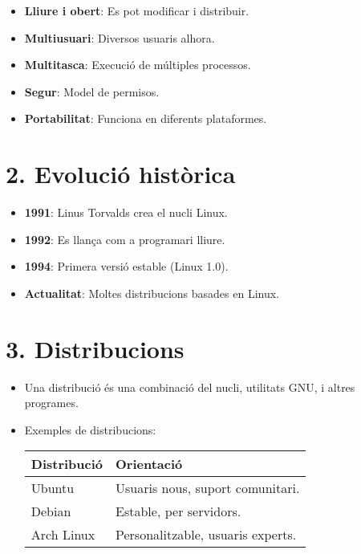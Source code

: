 \documentclass[
  a4paper,
]{article}
\providecommand{\tightlist}{%
  \setlength{\itemsep}{0pt}\setlength{\parskip}{0pt}}
\begin{document}
\begin{itemize}
\tightlist
\item
  \textbf{Lliure i obert}: Es pot modificar i distribuir.
\item
  \textbf{Multiusuari}: Diversos usuaris alhora.
\item
  \textbf{Multitasca}: Execució de múltiples processos.
\item
  \textbf{Segur}: Model de permisos.
\item
  \textbf{Portabilitat}: Funciona en diferents plataformes.
\end{itemize}

\section{2. Evolució històrica}\label{evoluciuxf3-histuxf2rica}

\begin{itemize}
\tightlist
\item
  \textbf{1991}: Linus Torvalds crea el nucli Linux.
\item
  \textbf{1992}: Es llança com a programari lliure.
\item
  \textbf{1994}: Primera versió estable (Linux 1.0).
\item
  \textbf{Actualitat}: Moltes distribucions basades en Linux.
\end{itemize}

\section{3. Distribucions}\label{distribucions}

\begin{itemize}
\item
  Una distribució és una combinació del nucli, utilitats GNU, i altres
  programes.
\item
  Exemples de distribucions:

  \begin{longtable}[]{@{}ll@{}}
  \toprule\noalign{}
  \textbf{Distribució} & \textbf{Orientació} \\
  \midrule\noalign{}
  \endhead
  \bottomrule\noalign{}
  \endlastfoot
  Ubuntu & Usuaris nous, suport comunitari. \\
  Debian & Estable, per servidors. \\
  Arch Linux & Personalitzable, usuaris experts. \\
  \end{longtable}
\end{itemize}
\end{document}
